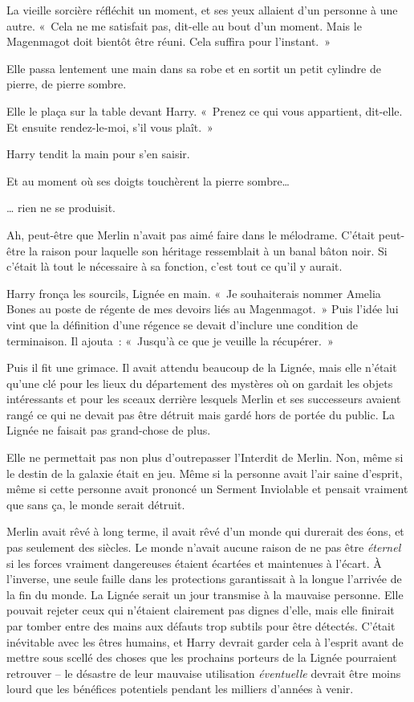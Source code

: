 La vieille sorcière réfléchit un moment, et ses yeux allaient d'un personne à une autre.
«~Cela ne me satisfait pas, dit-elle au bout d'un moment.
Mais le Magenmagot doit bientôt être réuni.
Cela suffira pour l'instant.~»

Elle passa lentement une main dans sa robe et en sortit un petit cylindre de pierre, de pierre sombre.

Elle le plaça sur la table devant Harry.
«~Prenez ce qui vous appartient, dit-elle.
Et ensuite rendez-le-moi, s'il vous plaît.~»

Harry tendit la main pour s'en saisir.

Et au moment où ses doigts touchèrent la pierre sombre…

… rien ne se produisit.

Ah, peut-être que Merlin n'avait pas aimé faire dans le mélodrame.
C'était peut-être la raison pour laquelle son héritage ressemblait à un banal bâton noir.
Si c'était là tout le nécessaire à sa fonction, c'est tout ce qu'il y aurait.

Harry fronça les sourcils, Lignée en main.
«~Je souhaiterais nommer Amelia Bones au poste de régente de mes devoirs liés au Magenmagot.~»
Puis l'idée lui vint que la définition d'une régence se devait d'inclure une condition de terminaison.
Il ajouta~: «~Jusqu'à ce que je veuille la récupérer.~»

Puis il fit une grimace.
Il avait attendu beaucoup de la Lignée, mais elle n'était qu'une clé pour les lieux du département des mystères où on gardait les objets intéressants et pour les sceaux derrière lesquels Merlin et ses successeurs avaient rangé ce qui ne devait pas être détruit mais gardé hors de portée du public.
La Lignée ne faisait pas grand-chose de plus.

Elle ne permettait pas non plus d'outrepasser l'Interdit de Merlin.
Non, même si le destin de la galaxie était en jeu.
Même si la personne avait l'air saine d'esprit, même si cette personne avait prononcé un Serment Inviolable et pensait vraiment que sans ça, le monde serait détruit.

Merlin avait rêvé à long terme, il avait rêvé d'un monde qui durerait des éons, et pas seulement des siècles.
Le monde n'avait aucune raison de ne pas être \emph{éternel} si les forces vraiment dangereuses étaient écartées et maintenues à l'écart.
À l'inverse, une seule faille dans les protections garantissait à la longue l'arrivée de la fin du monde.
La Lignée serait un jour transmise à la mauvaise personne.
Elle pouvait rejeter ceux qui n'étaient clairement pas dignes d'elle, mais elle finirait par tomber entre des mains aux défauts trop subtils pour être détectés.
C'était inévitable avec les êtres humains, et Harry devrait garder cela à l'esprit avant de mettre sous scellé des choses que les prochains porteurs de la Lignée pourraient retrouver -- le désastre de leur mauvaise utilisation \emph{éventuelle} devrait être moins lourd que les bénéfices potentiels pendant les milliers d'années à venir.

